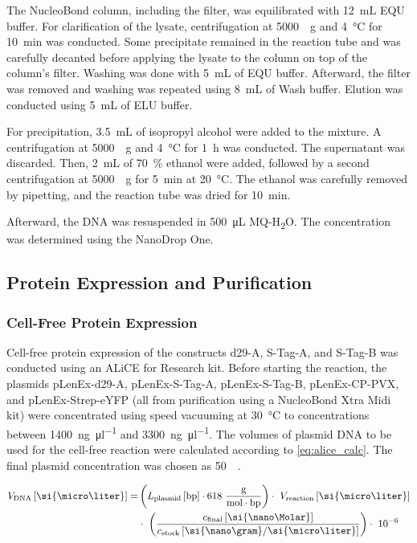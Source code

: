 The NucleoBond column, including the filter, was equilibrated with \SI{12}{\milli\liter} EQU buffer. For clarification of the lysate, centrifugation at \SI{5000}{\times g} and \SI{4}{\celsius} for \SI{10}{\minute} was conducted. Some precipitate remained in the reaction tube and was carefully decanted before applying the lysate to the column on top of the column's filter. Washing was done with \SI{5}{\milli\liter} of EQU buffer. Afterward, the filter was removed and washing was repeated using \SI{8}{\milli\liter} of Wash buffer. Elution was conducted using \SI{5}{\milli\liter} of ELU buffer.

For precipitation, \SI{3.5}{\milli\liter} of isopropyl alcohol were added to the mixture. A centrifugation at \SI{5000}{\times g} and \SI{4}{\celsius} for \SI{1}{\hour} was conducted. The supernatant was discarded. Then, \SI{2}{\milli\liter} of \SI{70}{\percent} ethanol were added, followed by a second centrifugation at \SI{5000}{\times g} for \SI{5}{\minute} at \SI{20}{\celsius}. The ethanol was carefully removed by pipetting, and the reaction tube was dried for \SI{10}{\minute}. 

Afterward, the DNA was resuspended in \SI{500}{\micro\liter} MQ-H\textsubscript{2}O. The concentration was determined using the NanoDrop\textsuperscript{\texttrademark} One.

\subsection{Protein Expression and Purification}
\subsubsection{Cell-Free Protein Expression}
Cell-free protein expression of the constructs d29-A, S-Tag-A, and S-Tag-B was conducted using an ALiCE\textsuperscript{\textregistered} for Research kit. Before starting the reaction, the plasmids pLenEx-d29-A, pLenEx-S-Tag-A, pLenEx-S-Tag-B, pLenEx-CP-PVX, and pLenEx-Strep-eYFP (all from purification using a NucleoBond Xtra Midi kit) were concentrated using speed vacuuming at \SI{30}{\degreeCelsius} to concentrations between \SI{1400}{\nano\gram\per\micro\litre} and \SI{3300}{\nano\gram\per\micro\litre}. The volumes of plasmid DNA to be used for the cell-free reaction were calculated according to \autoref{eq:alice_calc}. The final plasmid concentration was chosen as \SI{50}{\nano\Molar}. 

\begin{align}
    \label{eq:alice_calc}
    \begin{split}
V_{\text{DNA}}\, [\si{\micro\liter}] =&\left( L_{\text{plasmid}}\, [\text{bp}] \cdot 618\ \frac{\text{g}}{\text{mol} \cdot \text{bp}} \right) \cdot\ V_{\text{reaction}}\, [\si{\micro\liter}] \\
& \cdot\ \left( \frac{c_{\text{final}}\, [\si{\nano\Molar}]}{c_{\text{stock}}\, [\si{\nano\gram}/\si{\micro\liter}]} \right) \cdot\ 10^{-6}
    \end{split}
\end{align}

